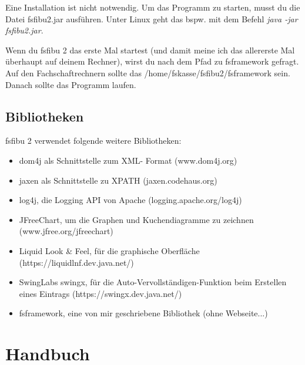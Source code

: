 \documentclass[a4paper,10pt,halfparskip,oneside,smallheadings]{scrbook}
\begin{document}
Eine Installation ist nicht notwendig. Um das Programm zu starten, musst du die Datei fsfibu2.jar ausführen. Unter Linux geht das bspw. mit dem Befehl \textit{java -jar fsfibu2.jar}.

Wenn du fsfibu 2 das erste Mal startest (und damit meine ich das allererste Mal überhaupt auf deinem Rechner), wirst 
du nach dem Pfad zu fsframework gefragt. Auf den Fachschaftrechnern sollte das /home/fskasse/fsfibu2/fsframework sein. Danach sollte das Programm laufen.

\section{Bibliotheken}
fsfibu 2 verwendet folgende weitere Bibliotheken:
\begin{itemize}
 \item dom4j als Schnittstelle zum XML- Format (www.dom4j.org)
 \item jaxen als Schnittstelle zu XPATH (jaxen.codehaus.org)
 \item log4j, die Logging API von Apache (logging.apache.org/log4j)
 \item JFreeChart, um die Graphen und Kuchendiagramme zu zeichnen (www.jfree.org/jfreechart)
 \item Liquid Look \& Feel, für die graphische Oberfläche (https://liquidlnf.dev.java.net/)
 \item SwingLabs swingx, für die Auto-Vervollständigen-Funktion beim Erstellen eines Eintrags (https://swingx.dev.java.net/)
 \item fsframework, eine von mir geschriebene Bibliothek (ohne Webseite...)
\end{itemize}


\chapter{Handbuch}
\end{document}
